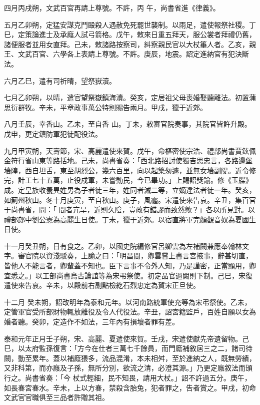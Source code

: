 \begin{pinyinscope}
 四月丙戌朔，文武百官再請上尊號。不許，丙
 午，尚書省進《律義》。



 五月乙卯朔，定猛安謀克鬥毆殺人遇赦免死罷世襲制。以雨足，遣使報祭社稷。丁巳，定策論進士及承廕人試弓箭格。戊午，敕來日重五拜天，服公裳者拜禮仍舊，諸便服者並用女直拜。己未，敕諸路按察司，糾察親民官以大杖箠人者。乙亥，親王、文武百官、六學各上表請上尊號。不許。庚辰，地震。詔定進納官有犯決斷法。



 六月乙巳，遣有司祈晴，望祭嶽瀆。



 七月乙卯朔，以晴，遣官望祭嶽鎮海瀆。癸亥，定居祖父母喪婚娶聽離法。初置蒲思衍群牧。辛未，平章政事萬公特則賜告兩月。甲戌，獵于近郊。



 八月壬辰，幸香山。乙未，至自香
 山。丁未，敕審官院奏事，其院官皆許升殿。戊申，更定鎮防軍犯徒配役法。



 九月甲寅朔，天壽節，宋、高麗遣使來賀。戊午，命樞密使宗浩、禮部尚書賈鉉佩金符行省山東等路括地。己未，尚書省奏：「西北路招討使獨吉思忠言，各路邊堡墻隍，西自坦舌，東至胡烈公，幾六百里，向以起築匆遽，並無女墻副隄。近令修完，計工七十五萬，止役戍軍，未嘗動民，今已畢功。」上賜詔獎諭。修《玉牒》成。定皇族收養異姓男為子者徒三年，姓同者減二等，立嫡違法者徒一年。癸亥，如薊州秋山。冬十月庚寅，至自秋山。庚子，風霾。宋遣使來告哀。辛丑，集百官于尚書省，問：「
 間者亢旱，近則久陰，豈政有錯謬而致然歟？」各以所見對。以禮部郎中劉公憲為高麗生日使。丁未，獵于近郊。以宿直將軍完顏觀音奴為夏國生日使。



 十一月癸丑朔，日有食之。乙卯，以國史院編修官呂卿雲為左補闕兼應奉翰林文字。審官院以資淺駁奏，上諭之曰：「明昌間，卿雲嘗上書言宮掖事，辭甚切直，皆他人不能言者，卿輩蓋不知也。臣下言事不令外人知，乃是謹密，正當顯用，卿宜悉之。」以工部尚書烏古論誼等為宋弔祭使。初定品官過闕則下制。己巳，宋復遣使來告哀。辛未，以殿前右副點檢紇石烈忠定為賀宋正旦使。



 十二月
 癸未朔，詔改明年為泰和元年。以河南路統軍使充等為宋弔祭使。乙未，定管軍官受所部財物輒放離役及令人代役法。辛丑，詔宮籍監戶，百姓自願以女為婚者聽。癸卯，定造作不如法，三年內有損壞者罪有差。



 泰和元年正月壬子朔，宋、高麗、夏遣使來賀。壬戌，宋遣使獻先帝遺留物。己巳，以太府監孫復言：「方今在仕者三萬七千餘員，而門廕補敘居三之二，諸司待闕，動至累年。蓋以補廕猥多，流品混淆，本未相舛，至於進納之人，既無勞績，又非科第，而亦廕及子孫，無所分別，欲流之清，必澄其源。」乃更定廕敘法而頒行之。尚書省奏：「今
 杖式輕細，民不知畏，請用大杖。」詔不許過五分。庚午，如長春宮春水。辛未，上以方春，禁殺含胎兔，犯者罪之，告者賞之。甲戌，初命文武官官職俱至三品者許贈其祖。




\end{pinyinscope}
